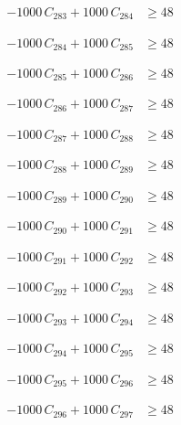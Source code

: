 \documentclass[a4paper,11pt]{article}
\begin{document}
\begin{align}
-1000\,C_{283} + 1000\,C_{284} &\geq 48 \nonumber
\end{align}

\begin{align}
-1000\,C_{284} + 1000\,C_{285} &\geq 48 \nonumber
\end{align}

\begin{align}
-1000\,C_{285} + 1000\,C_{286} &\geq 48 \nonumber
\end{align}

\begin{align}
-1000\,C_{286} + 1000\,C_{287} &\geq 48 \nonumber
\end{align}

\begin{align}
-1000\,C_{287} + 1000\,C_{288} &\geq 48 \nonumber
\end{align}

\begin{align}
-1000\,C_{288} + 1000\,C_{289} &\geq 48 \nonumber
\end{align}

\begin{align}
-1000\,C_{289} + 1000\,C_{290} &\geq 48 \nonumber
\end{align}

\begin{align}
-1000\,C_{290} + 1000\,C_{291} &\geq 48 \nonumber
\end{align}

\begin{align}
-1000\,C_{291} + 1000\,C_{292} &\geq 48 \nonumber
\end{align}

\begin{align}
-1000\,C_{292} + 1000\,C_{293} &\geq 48 \nonumber
\end{align}

\begin{align}
-1000\,C_{293} + 1000\,C_{294} &\geq 48 \nonumber
\end{align}

\begin{align}
-1000\,C_{294} + 1000\,C_{295} &\geq 48 \nonumber
\end{align}

\begin{align}
-1000\,C_{295} + 1000\,C_{296} &\geq 48 \nonumber
\end{align}

\begin{align}
-1000\,C_{296} + 1000\,C_{297} &\geq 48 \nonumber
\end{align}
\end{document}
